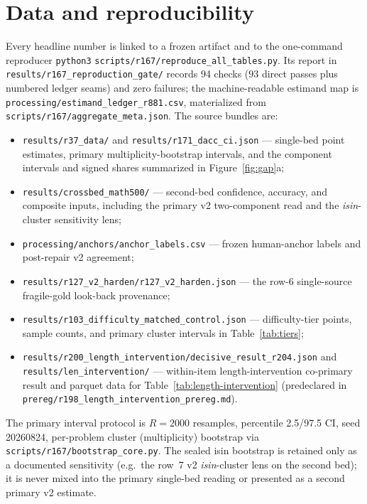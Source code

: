 \documentclass{article}
\begin{document}
\section*{Data and reproducibility}
Every headline number is linked to a frozen artifact and to the one-command reproducer
\texttt{python3} \nolinkurl{scripts/r167/reproduce_all_tables.py}.  Its report in
\nolinkurl{results/r167_reproduction_gate/} records 94 checks ($93$ direct passes plus
numbered ledger seams) and zero failures; the
machine-readable estimand map is \nolinkurl{processing/estimand_ledger_r881.csv},
materialized from \nolinkurl{scripts/r167/aggregate_meta.json}.  The source bundles are:
\begin{itemize}
\raggedright  %
\item \nolinkurl{results/r37_data/} and \nolinkurl{results/r171_dacc_ci.json} ---
single-bed point estimates, primary multiplicity-bootstrap intervals, and the
component intervals and signed shares summarized in Figure~\ref{fig:gap}a;
\item \nolinkurl{results/crossbed_math500/} --- second-bed confidence, accuracy, and
composite inputs, including the primary v2 two-component read and the \emph{isin}-cluster sensitivity lens;
\item \nolinkurl{processing/anchors/anchor_labels.csv} --- frozen human-anchor labels and
post-repair v2 agreement;
\item \nolinkurl{results/r127_v2_harden/r127_v2_harden.json} --- the row-6
single-source fragile-gold look-back provenance;
\item \nolinkurl{results/r103_difficulty_matched_control.json} --- difficulty-tier
points, sample counts, and primary cluster intervals in Table~\ref{tab:tiers};
\item \nolinkurl{results/r200_length_intervention/decisive_result_r204.json} and
\nolinkurl{results/len_intervention/} --- within-item length-intervention
co-primary result and parquet data for Table~\ref{tab:length-intervention}
(predeclared in \nolinkurl{prereg/r198_length_intervention_prereg.md}).
\end{itemize}
The primary interval protocol is $R=2000$ resamples, percentile 2.5/97.5 CI,
seed 20260824, per-problem cluster (multiplicity) bootstrap via
\nolinkurl{scripts/r167/bootstrap_core.py}.  The sealed isin bootstrap is retained only
as a documented sensitivity (e.g.\ the row~7 v2 \emph{isin}-cluster lens on the second
bed); it is never mixed into the primary single-bed reading or presented as a second
primary v2 estimate.
\end{document}
